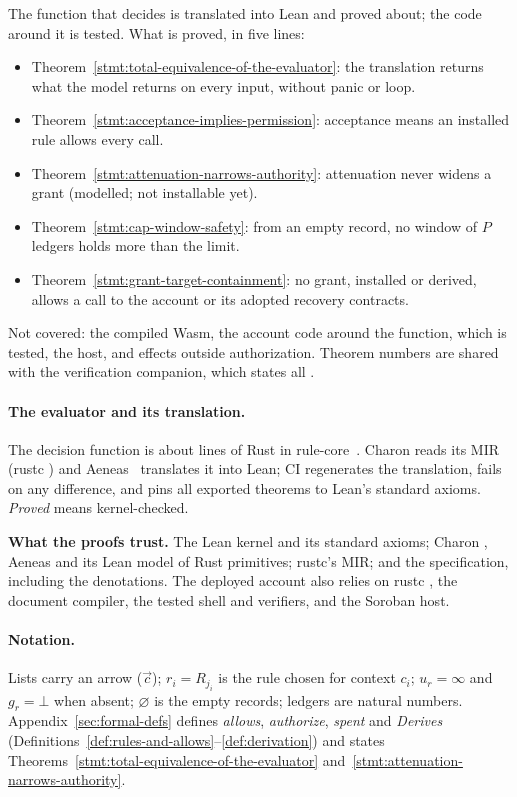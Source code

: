 The function that decides is translated into Lean and proved about; the code
around it is tested. What is proved, in five lines:
\begin{itemize}[nosep,leftmargin=*]
\item Theorem~\ref{stmt:total-equivalence-of-the-evaluator}: the translation
  returns what the model returns on every input, without panic or loop.
\item Theorem~\ref{stmt:acceptance-implies-permission}: acceptance means an
  installed rule allows every call.
\item Theorem~\ref{stmt:attenuation-narrows-authority}: attenuation never widens
  a grant (modelled; not installable yet).
\item Theorem~\ref{stmt:cap-window-safety}: from an empty record, no window of
  $P$ ledgers holds more than the limit.
\item Theorem~\ref{stmt:grant-target-containment}: no grant, installed or
  derived, allows a call to the account or its adopted recovery contracts.
\end{itemize}
Not covered: the compiled Wasm, the account
code around the function, which is tested, the host, and effects outside
authorization. Theorem numbers are shared with the verification companion,
which states all .

\paragraph{The evaluator and its translation.} The decision function is about
 lines of  Rust in
rule-core~. Charon reads its MIR (rustc
) and Aeneas~\cite{aeneas} translates it into Lean; CI
regenerates the translation, fails on any difference, and pins all
 exported theorems to Lean's standard axioms.
\emph{Proved} means kernel-checked.

\begin{perchbox}
\textbf{What the proofs trust.} The Lean kernel and its standard axioms; Charon
, Aeneas  and its Lean model of Rust
primitives; rustc's MIR; and the specification, including the denotations. The
deployed account also relies on rustc , the document
compiler, the tested shell and verifiers, and the Soroban host.
\end{perchbox}

\paragraph{Notation.} Lists carry an arrow ($\vec c$); $r_i = R_{j_i}$ is the
rule chosen for context $c_i$; $u_r = \infty$ and $g_r = \bot$ when absent;
$\varnothing$ is the empty records; ledgers are natural numbers.
Appendix~\ref{sec:formal-defs} defines \emph{allows}, \emph{authorize},
\emph{spent} and \emph{Derives} (Definitions~\ref{def:rules-and-allows}--\ref{def:derivation})
and states Theorems~\ref{stmt:total-equivalence-of-the-evaluator}
and~\ref{stmt:attenuation-narrows-authority}.






